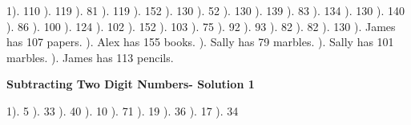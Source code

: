 \documentclass{article}%
\begin{document}
1). 110%
). 119%
). 81%
). 119%
). 152%
). 130%
). 52%
). 130%
). 139%
). 83%
). 134%
). 130%
). 140%
). 86%
). 100%
). 124%
). 102%
). 152%
). 103%
). 75%
). 92%
). 93%
). 82%
). 82%
). 130%
). James has 107 papers.%
). Alex has 155 books.%
). Sally has 79 marbles.%
). Sally has 101 marbles.%
). James has 113 pencils.%
\newline%
\newpage%
\large%
\begin{center}%
\textbf{Subtracting Two Digit Numbers- Solution 1}%
\newline%
\end{center} \normalsize%
1). 5%
). 33%
). 40%
). 10%
). 71%
). 19%
). 36%
). 17%
). 34%
\newline%
\end{document}
